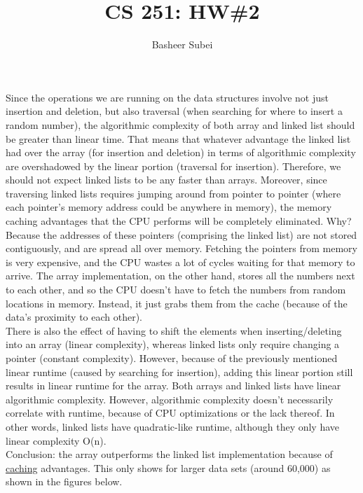\documentclass[11pt, twoside]{article}
\begin{document}


\title{CS 251: HW\#2}
\author{Basheer Subei}


\maketitle

Since the operations we are running on the data structures involve not just
insertion and deletion, but also traversal (when searching for where to insert
a random number), the algorithmic complexity of both array and linked list
should be greater than linear time. That means that whatever advantage the
linked list had over the array (for insertion and deletion) in terms of
algorithmic complexity are overshadowed by the linear portion (traversal for
insertion). Therefore, we should not expect linked lists to be any faster than
arrays. Moreover, since traversing linked lists requires jumping around from pointer to pointer (where each pointer's memory address could be anywhere in memory), the memory caching advantages that the CPU performs will be completely eliminated. Why? Because the addresses of these pointers (comprising the linked list) are not stored contiguously, and are spread all over memory. Fetching the pointers from memory is very expensive, and the CPU wastes a lot of cycles waiting for that memory to arrive. The array implementation, on the other hand, stores all the numbers next to each other, and so the CPU doesn't have to fetch the numbers from random locations in memory. Instead, it just grabs them from the cache (because of the data's proximity to each other).\\

There is also the effect of having to shift the elements when inserting/deleting into an array (linear complexity), whereas linked lists only require changing a pointer (constant complexity). However, because of the previously mentioned linear runtime (caused by searching for insertion), adding this linear portion still results in linear runtime for the array. Both arrays and linked lists have linear algorithmic complexity. However, algorithmic complexity doesn't necessarily correlate with runtime, because of CPU optimizations or the lack thereof. In other words, linked lists have quadratic-like runtime, although they only have linear complexity O(n).\\

Conclusion: the array outperforms the linked list implementation because of \href{http://gameprogrammingpatterns.com/data-locality.html}{caching} advantages. This only shows for larger data sets (around 60,000) as shown in the figures below.
\end{document}
